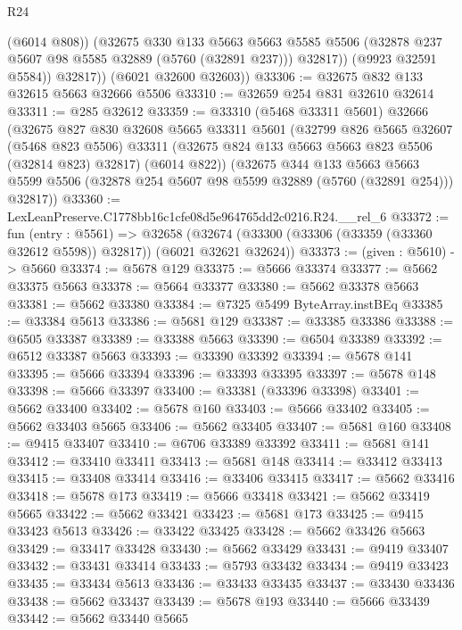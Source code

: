 \begin{lexlean}{R24}
\begin{coremodule}
                (@6014 @808))
              (@32675
                @330
                @133
                @5663
                @5663
                @5585
                @5506
                (@32878 @237 @5607 @98 @5585 @32889 (@5760 (@32891 @237)))
                @32817))
            (@9923 @32591 @5584))
          @32817))
      (@6021 @32600 @32603))
@33306 := @32675 @832 @133 @32615 @5663 @32666 @5506
@33310 := @32659 @254 @831 @32610 @32614
@33311 := @285 @32612
@33359 := @33310
    (@5468 @33311 @5601)
    @32666
    (@32675
      @827
      @830
      @32608
      @5665
      @33311
      @5601
      (@32799
        @826
        @5665
        @32607
        (@5468 @823 @5506)
        @33311
        (@32675 @824 @133 @5663 @5663 @823 @5506 (@32814 @823) @32817)
        (@6014 @822))
      (@32675
        @344
        @133
        @5663
        @5663
        @5599
        @5506
        (@32878 @254 @5607 @98 @5599 @32889 (@5760 (@32891 @254)))
        @32817))
@33360 := LexLeanPreserve.C1778bb16c1cfe08d5e964765dd2c0216.R24.__rel_6
@33372 := fun (entry : @5561) =>
  @32658 (@32674 (@33300 (@33306 (@33359 (@33360 @32612 @5598)) @32817)) (@6021 @32621 @32624))
@33373 := (given : @5610) -> @5660
@33374 := @5678 @129
@33375 := @5666 @33374
@33377 := @5662 @33375 @5663
@33378 := @5664 @33377
@33380 := @5662 @33378 @5663
@33381 := @5662 @33380
@33384 := @7325 @5499 ByteArray.instBEq
@33385 := @33384 @5613
@33386 := @5681 @129
@33387 := @33385 @33386
@33388 := @6505 @33387
@33389 := @33388 @5663
@33390 := @6504 @33389
@33392 := @6512 @33387 @5663
@33393 := @33390 @33392
@33394 := @5678 @141
@33395 := @5666 @33394
@33396 := @33393 @33395
@33397 := @5678 @148
@33398 := @5666 @33397
@33400 := @33381 (@33396 @33398)
@33401 := @5662 @33400
@33402 := @5678 @160
@33403 := @5666 @33402
@33405 := @5662 @33403 @5665
@33406 := @5662 @33405
@33407 := @5681 @160
@33408 := @9415 @33407
@33410 := @6706 @33389 @33392
@33411 := @5681 @141
@33412 := @33410 @33411
@33413 := @5681 @148
@33414 := @33412 @33413
@33415 := @33408 @33414
@33416 := @33406 @33415
@33417 := @5662 @33416
@33418 := @5678 @173
@33419 := @5666 @33418
@33421 := @5662 @33419 @5665
@33422 := @5662 @33421
@33423 := @5681 @173
@33425 := @9415 @33423 @5613
@33426 := @33422 @33425
@33428 := @5662 @33426 @5663
@33429 := @33417 @33428
@33430 := @5662 @33429
@33431 := @9419 @33407
@33432 := @33431 @33414
@33433 := @5793 @33432
@33434 := @9419 @33423
@33435 := @33434 @5613
@33436 := @33433 @33435
@33437 := @33430 @33436
@33438 := @5662 @33437
@33439 := @5678 @193
@33440 := @5666 @33439
@33442 := @5662 @33440 @5665

\end{coremodule}
\end{lexlean}
